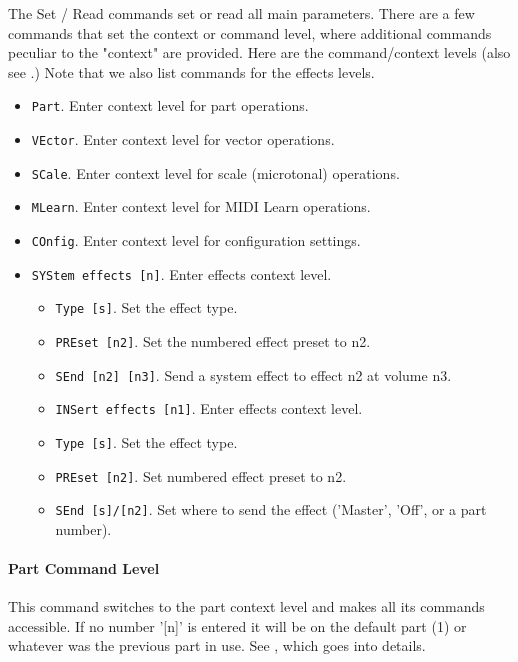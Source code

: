    The Set / Read commands set or read all main parameters.  There are a few
   commands that set the context or command level, where additional commands
   peculiar to the "context" are provided.  Here are the command/context levels
   (also see .)
   Note that we also list commands for the effects levels.

   \begin{itemize}
      \item \texttt{Part}. Enter context level for part operations.
      \item \texttt{VEctor}. Enter context level for vector operations.
      \item \texttt{SCale}. Enter context level for scale (microtonal) operations.
      \item \texttt{MLearn}. Enter context level for MIDI Learn operations.
      \item \texttt{COnfig}. Enter context level for configuration settings.
      \item \texttt{SYStem effects [n]}. Enter effects context level.
      \begin{itemize}
         \item \texttt{Type [s]}.  Set the effect type.
         \item \texttt{PREset [n2]}. Set the numbered effect preset to n2.
         \item \texttt{SEnd [n2] [n3]}. Send a system effect to effect n2
            at volume n3.
      \end{itemize}
      \begin{itemize}
   \item \texttt{INSert effects [n1]}. Enter effects context level.
         \item \texttt{Type [s]}. Set the effect type.
         \item \texttt{PREset [n2]}. Set numbered effect preset to n2.
         \item \texttt{SEnd [s]/[n2]}. Set where to send the effect
            ('Master', 'Off', or a part number).
      \end{itemize}
   \end{itemize}

\paragraph{Part Command Level}
\label{paragraph:command_line_context_level_part}

   This command switches to the part context level and makes all its commands
   accessible.  If no number '[n]' is entered it will be on the default part
   (1) or whatever was the previous part in use.
   See , which goes into
   details.

